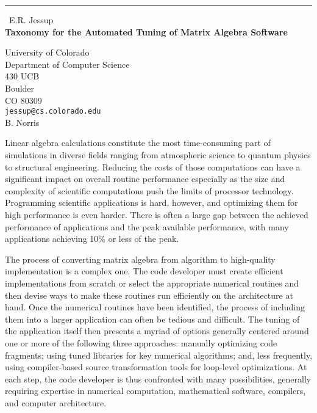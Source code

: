 \documentclass{report}
\begin{document}
\begin{center}
\rule{6in}{1pt} \
{\large E.R. Jessup \\
{\bf Taxonomy for the Automated Tuning of Matrix Algebra Software}}

University of Colorado \\ Department of Computer Science \\ 430 UCB \\ Boulder \\ CO 80309
\\
{\tt jessup@cs.colorado.edu}\\
B. Norris\end{center}

Linear algebra calculations constitute the most time-consuming part
of simulations in diverse fields ranging from atmospheric science to
quantum physics to structural engineering. Reducing the costs of those
computations can have a significant impact on overall routine performance
especially as the size and complexity of scientific computations push
the limits of processor technology. Programming scientific applications
is hard, however, and optimizing them for high performance is even
harder. There is often a large gap between the achieved performance of
applications and the peak available performance, with many applications
achieving 10\% or less of the peak.

The process of converting matrix algebra from algorithm to high-quality
implementation is a complex one. The code developer must create efficient
implementations from scratch or select the appropriate numerical
routines and then devise ways to make these routines run efficiently
on the architecture at hand. Once the numerical routines have been
identified, the process of including them into a larger application
can often be tedious and difficult. The tuning of the application
itself then presents a myriad of options generally centered around one
or more of the following three approaches: manually optimizing code
fragments; using tuned libraries for key numerical algorithms; and,
less frequently, using compiler-based source transformation tools for
loop-level optimizations. At each step, the code developer is thus
confronted with many possibilities, generally requiring expertise in
numerical computation, mathematical software, compilers, and computer
architecture.
\end{document}
